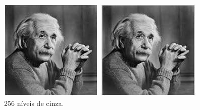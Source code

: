 \documentclass[a4paper, 12pt]{article}
\begin{document}
\begin{figure}[!htb]
	\centering
	  	\includegraphics[width=\linewidth]{images/einstein256.jpg}
	  	\caption{256 níveis de cinza.}
	\endminipage\hspace{1cm}
	 	\includegraphics[width=\linewidth]{images/128.jpg}

\end{figure}
\end{document}
